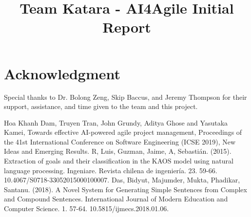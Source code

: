 \documentclass[11pt,journal,onecolumn]{IEEEtran}
\begin{document}
\title{Team Katara - AI4Agile Initial Report}

\author{
}

\maketitle

\let\clearpage\relax











\section*{Acknowledgment}

Special thanks to Dr. Bolong Zeng, Skip Baccus, and Jeremy Thompson for their support, assistance, and time given to the team and this project.

\begin{thebibliography}{00} 
 Hoa Khanh Dam, Truyen Tran, John Grundy, Aditya Ghose and Yasutaka Kamei, Towards effective AI-powered agile project management, Proceedings of the 41st International Conference on Software Engineering (ICSE 2019), New Ideas and Emerging Results.
 R, Luis, Guzman, Jaime, A, Sebastián. (2015). Extraction of goals and their classification in the KAOS model using natural language processing. Ingeniare. Revista chilena de ingeniería. 23. 59-66. 10.4067/S0718-33052015000100007.
 Das, Bidyut, Majumder, Mukta, Phadikar, Santanu. (2018). A Novel System for Generating Simple Sentences from Complex and Compound Sentences. International Journal of Modern Education and Computer Science. 1. 57-64. 10.5815/ijmecs.2018.01.06.
\end{thebibliography}
\end{document}
